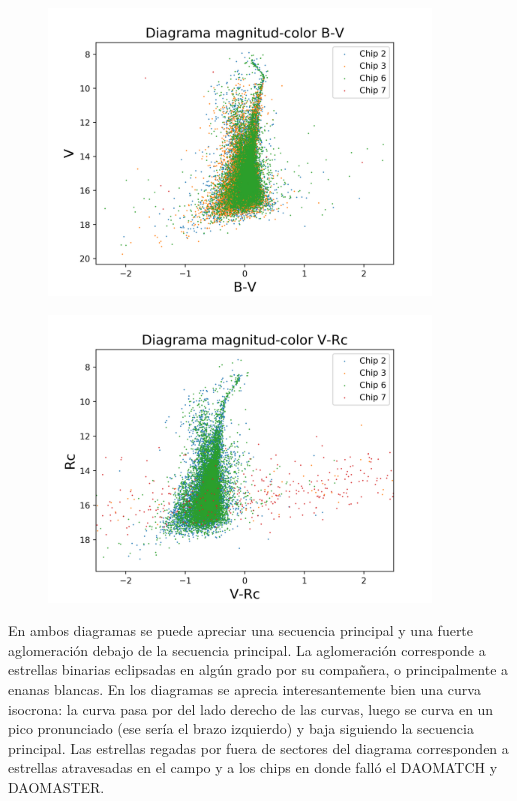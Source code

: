 \documentclass[12pt]{article}
\begin{document}
\begin{figure}[H]
  \centering
   \includegraphics[width = 4in]{diagramaMagnitudColor.png}
\end{figure}
\begin{figure}[H]
  \centering
   \includegraphics[width = 4in]{diagramaMagnitudColor2.png}
\end{figure}
   

En ambos diagramas se puede apreciar una secuencia principal y una fuerte aglomeración debajo de la secuencia principal. La aglomeración corresponde a estrellas binarias eclipsadas en algún grado por su compañera, o principalmente a enanas blancas. En los diagramas se aprecia interesantemente bien una curva isocrona: la curva pasa por  del lado derecho de las curvas, luego se curva en un pico pronunciado (ese sería el brazo izquierdo) y baja siguiendo la secuencia principal. Las estrellas regadas por fuera de sectores del diagrama corresponden a estrellas atravesadas en el campo y a los chips en donde falló el DAOMATCH y DAOMASTER.



%

\end{document}
